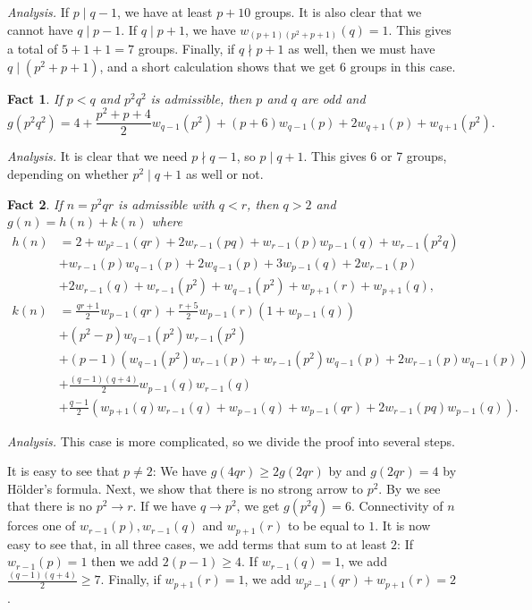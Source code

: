 \documentclass{article}
\newcommand{\hthref}[1]{\hyperref[#1]{\thref{#1}}}
\theoremstyle{plain}
\newtheorem{eufact}{Fact}[section]
\theoremstyle{definition}
\begin{document}
\textit{Analysis.} If $p \mid q - 1$, we have at least $p + 10$ groups. It is also clear that we cannot have $q \mid p - 1$. If $q \mid p + 1$, we have $w_{(p + 1)(p^2 + p + 1)}(q) = 1$. This gives a total of $5 + 1 + 1 = 7$ groups. Finally, if $q \nmid p + 1$ as well, then we must have $q \mid (p^2 + p + 1)$, and a short calculation shows that we get $6$ groups in this case.

\begin{eufact}
	If $p < q$ and $p^2 q^2$ is admissible, then $p$ and $q$ are odd and
	\[g(p^2 q^2) = 4 + \frac{p^2 + p + 4}{2} w_{q - 1}(p^2) + (p + 6)w_{q - 1}(p) + 2w_{q + 1}(p) + w_{q + 1}(p^2).\]
\end{eufact}

\textit{Analysis.} It is clear that we need $p \nmid q - 1$, so $p \mid q + 1$. This gives 6 or 7 groups, depending on whether $p^2 \mid q + 1$ as well or not.

\begin{eufact} 
	If $n = p^2 q r$ is admissible with $q < r$, then $q > 2$ and $g(n) = h(n) + k(n)$ where$$\begin{aligned}
		h(n) &= 2 + w_{p^2 - 1}(qr) + 2w_{r - 1}(pq) + w_{r - 1}(p)w_{p - 1}(q) + w_{r - 1}(p^2 q) \\ 
		&+ w_{r - 1}(p)w_{q - 1}(p) + 2w_{q - 1}(p) + 3w_{p - 1}(q) + 2w_{r - 1}(p) \\ 
		&+ 2w_{r - 1}(q) + w_{r - 1}(p^2) + w_{q - 1}(p^2) + w_{p + 1}(r) + w_{p + 1}(q), \\
		k(n) &= \frac{qr + 1}{2} w_{p - 1}(qr) + \frac{r + 5}{2} w_{p - 1}(r)(1 + w_{p - 1}(q))\\
		&+ (p^2 - p)w_{q - 1}(p^2)w_{r - 1}(p^2) \\
		&+ (p - 1)(w_{q - 1}(p^2)w_{r - 1}(p) + w_{r - 1}(p^2)w_{q - 1}(p) + 2w_{r - 1}(p)w_{q - 1}(p)) \\
		&+ \frac{(q - 1)(q + 4)}{2} w_{p - 1}(q)w_{r - 1}(q) \\
		&+ \frac{q - 1}{2} (w_{p + 1}(q)w_{r - 1}(q) + w_{p - 1}(q) + w_{p - 1}(qr) + 2w_{r - 1}(pq)w_{p - 1}(q)).
	\end{aligned}$$
\end{eufact}

\textit{Analysis.} This case is more complicated, so we divide the proof into several steps.

It is easy to see that $p \neq 2$: We have $g(4 q r) \ge 2g(2qr)$ by \hthref{eubold} and $g(2qr) = 4$ by Hölder's formula. Next, we show that there is no strong arrow to $p^2$. By \hthref{euppq} we see that there is no $p^2 \rightarrow r$. If we have $q \rightarrow p^2$, we get $g(p^2 q) = 6$.  Connectivity of $n$ forces one of $w_{r - 1}(p), w_{r - 1}(q)$ and $w_{p + 1}(r)$ to be equal to $1$. It is now easy to see that, in all three cases, we add terms that sum to at least $2$: If $w_{r - 1}(p) = 1$ then we add  $2(p - 1) \ge 4$. If $w_{r - 1}(q) = 1$, we add $\frac{(q - 1)(q + 4)}{2} \ge 7$. Finally, if $w_{p + 1}(r) = 1$, we add $w_{p^2 - 1}(qr) + w_{p + 1}(r) = 2$. 
\end{document}
